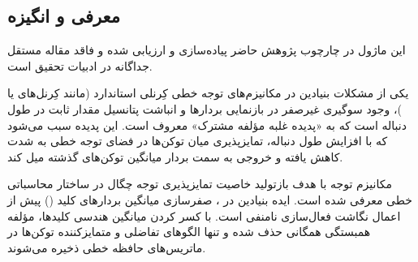 \subsection{معرفی و انگیزه}
این ماژول در چارچوب پژوهش حاضر پیاده‌سازی و ارزیابی شده و فاقد مقاله مستقل جداگانه در ادبیات تحقیق است.

یکی از مشکلات بنیادین در مکانیزم‌های توجه خطی کِرنلی استاندارد (مانند کِرنل‌های  یا )، وجود سوگیری غیرصفر در بازنمایی بردارها و انباشت پتانسیل مقدار ثابت در طول دنباله است که به «پدیده غلبه مؤلفه مشترک» معروف است. این پدیده سبب می‌شود که با افزایش طول دنباله، تمایزپذیری میان توکن‌ها در فضای توجه خطی به شدت کاهش یافته و خروجی به سمت بردار میانگین توکن‌های گذشته میل کند.

مکانیزم توجه  با هدف بازتولید خاصیت تمایزپذیری توجه چگال در ساختار محاسباتی خطی معرفی شده است. ایده بنیادین در ، صفرسازی میانگین بردارهای کلید () پیش از اعمال نگاشت فعال‌سازی نامنفی  است. با کسر کردن میانگین هندسی کلیدها، مؤلفه همبستگی همگانی حذف شده و تنها الگوهای تفاضلی و متمایزکننده توکن‌ها در ماتریس‌های حافظه خطی ذخیره می‌شوند.
